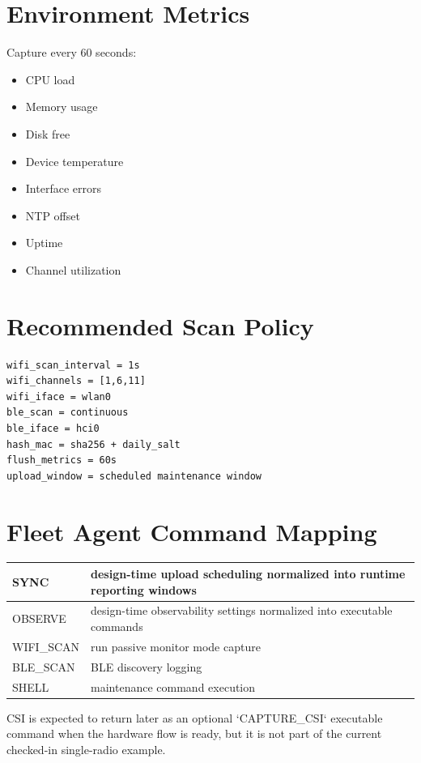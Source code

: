 \documentclass[11pt,a4paper]{article}
\begin{document}
\section{Environment Metrics}

Capture every 60 seconds:

\begin{itemize}
\item CPU load
\item Memory usage
\item Disk free
\item Device temperature
\item Interface errors
\item NTP offset
\item Uptime
\item Channel utilization
\end{itemize}

\section{Recommended Scan Policy}

\begin{lstlisting}
wifi_scan_interval = 1s
wifi_channels = [1,6,11]
wifi_iface = wlan0
ble_scan = continuous
ble_iface = hci0
hash_mac = sha256 + daily_salt
flush_metrics = 60s
upload_window = scheduled maintenance window
\end{lstlisting}

\section{Fleet Agent Command Mapping}

\begin{longtable}{|p{4cm}|p{10cm}|}
\hline
SYNC & design-time upload scheduling normalized into runtime reporting windows \\
\hline
OBSERVE & design-time observability settings normalized into executable commands \\
\hline
WIFI\_SCAN & run passive monitor mode capture \\
\hline
BLE\_SCAN & BLE discovery logging \\
\hline
SHELL & maintenance command execution \\
\hline
\end{longtable}

CSI is expected to return later as an optional `CAPTURE_CSI` executable command when the hardware flow is ready, but it is not part of the current checked-in single-radio example.
\end{document}
